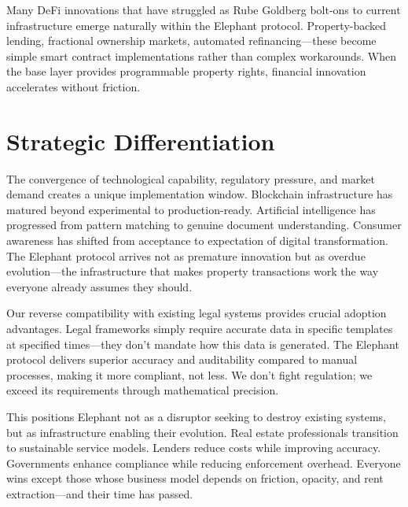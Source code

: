 Many DeFi innovations that have struggled as Rube Goldberg bolt-ons to current infrastructure emerge naturally within the Elephant protocol. Property-backed lending, fractional ownership markets, automated refinancing—these become simple smart contract implementations rather than complex workarounds. When the base layer provides programmable property rights, financial innovation accelerates without friction.

\section{Strategic Differentiation}

The convergence of technological capability, regulatory pressure, and market demand creates a unique implementation window. Blockchain infrastructure has matured beyond experimental to production-ready. Artificial intelligence has progressed from pattern matching to genuine document understanding. Consumer awareness has shifted from acceptance to expectation of digital transformation. The Elephant protocol arrives not as premature innovation but as overdue evolution—the infrastructure that makes property transactions work the way everyone already assumes they should.

Our reverse compatibility with existing legal systems provides crucial adoption advantages. Legal frameworks simply require accurate data in specific templates at specified times—they don't mandate how this data is generated. The Elephant protocol delivers superior accuracy and auditability compared to manual processes, making it more compliant, not less. We don't fight regulation; we exceed its requirements through mathematical precision.

This positions Elephant not as a disruptor seeking to destroy existing systems, but as infrastructure enabling their evolution. Real estate professionals transition to sustainable service models. Lenders reduce costs while improving accuracy. Governments enhance compliance while reducing enforcement overhead. Everyone wins except those whose business model depends on friction, opacity, and rent extraction—and their time has passed.